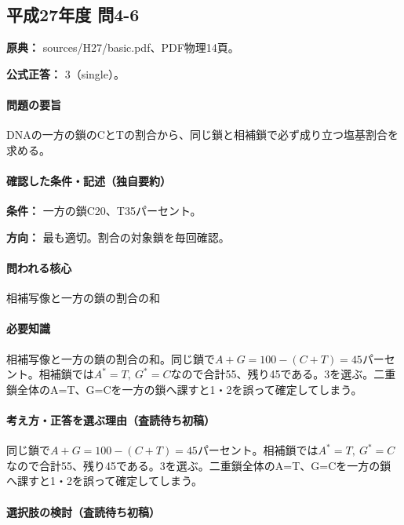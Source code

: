\subsection{平成27年度 問4-6}
\label{q:h27-reg-basic-4-6}

\noindent\textbf{原典：} sources/H27/basic.pdf、PDF物理14頁。

\textbf{公式正答：} 3（single）。

\paragraph{問題の要旨} DNAの一方の鎖のCとTの割合から、同じ鎖と相補鎖で必ず成り立つ塩基割合を求める。

\paragraph{確認した条件・記述（独自要約）}\mbox{}\par

\noindent\textbf{条件：} 一方の鎖C20、T35パーセント。\par

\noindent\textbf{方向：} 最も適切。割合の対象鎖を毎回確認。\par

\paragraph{問われる核心} 相補写像と一方の鎖の割合の和

\paragraph{必要知識} 相補写像と一方の鎖の割合の和。同じ鎖で\(A+G=100-(C+T)=45\)パーセント。相補鎖では\(A^{\ast}=T,\ G^{\ast}=C\)なので合計55、残り45である。3を選ぶ。二重鎖全体のA=\allowbreak{}T、G=\allowbreak{}Cを一方の鎖へ課すと1・2を誤って確定してしまう。

\paragraph{考え方・正答を選ぶ理由（査読待ち初稿）} 同じ鎖で\(A+G=100-(C+T)=45\)パーセント。相補鎖では\(A^{\ast}=T,\ G^{\ast}=C\)なので合計55、残り45である。3を選ぶ。二重鎖全体のA=\allowbreak{}T、G=\allowbreak{}Cを一方の鎖へ課すと1・2を誤って確定してしまう。

\paragraph{選択肢の検討（査読待ち初稿）}\mbox{}\par

